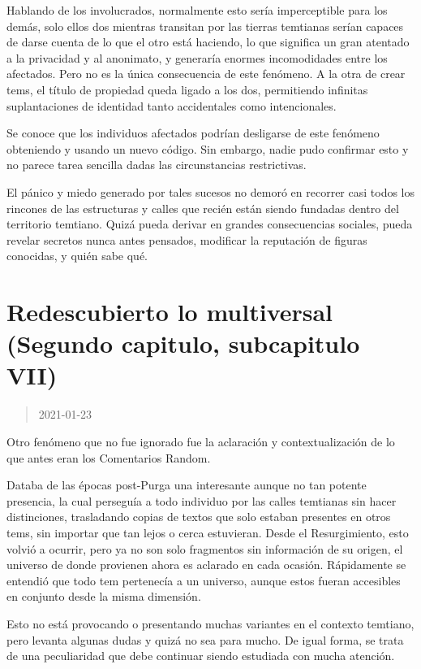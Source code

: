 \documentclass[
  spanish,
]{book}
\begin{document}
Hablando de los involucrados, normalmente esto sería imperceptible para los demás, solo ellos dos mientras transitan por las tierras temtianas serían capaces de darse cuenta de lo que el otro está haciendo, lo que significa un gran atentado a la privacidad y al anonimato, y generaría enormes incomodidades entre los afectados. Pero no es la única consecuencia de este fenómeno. A la otra de crear tems, el título de propiedad queda ligado a los dos, permitiendo infinitas suplantaciones de identidad tanto accidentales como intencionales.

Se conoce que los individuos afectados podrían desligarse de este fenómeno obteniendo y usando un nuevo código. Sin embargo, nadie pudo confirmar esto y no parece tarea sencilla dadas las circunstancias restrictivas.

El pánico y miedo generado por tales sucesos no demoró en recorrer casi todos los rincones de las estructuras y calles que recién están siendo fundadas dentro del territorio temtiano. Quizá pueda derivar en grandes consecuencias sociales, pueda revelar secretos nunca antes pensados, modificar la reputación de figuras conocidas, y quién sabe qué.

\hypertarget{redescubierto-lo-multiversal-segundo-capitulo-subcapitulo-vii}{%
\section{Redescubierto lo multiversal (Segundo capitulo, subcapitulo VII)}\label{redescubierto-lo-multiversal-segundo-capitulo-subcapitulo-vii}}

\begin{quote}
2021-01-23
\end{quote}

Otro fenómeno que no fue ignorado fue la aclaración y contextualización de lo que antes eran los Comentarios Random.

Databa de las épocas post-Purga una interesante aunque no tan potente presencia, la cual perseguía a todo individuo por las calles temtianas sin hacer distinciones, trasladando copias de textos que solo estaban presentes en otros tems, sin importar que tan lejos o cerca estuvieran.
Desde el Resurgimiento, esto volvió a ocurrir, pero ya no son solo fragmentos sin información de su origen, el universo de donde provienen ahora es aclarado en cada ocasión. Rápidamente se entendió que todo tem pertenecía a un universo, aunque estos fueran accesibles en conjunto desde la misma dimensión.

Esto no está provocando o presentando muchas variantes en el contexto temtiano, pero levanta algunas dudas y quizá no sea para mucho. De igual forma, se trata de una peculiaridad que debe continuar siendo estudiada con mucha atención.
\end{document}
